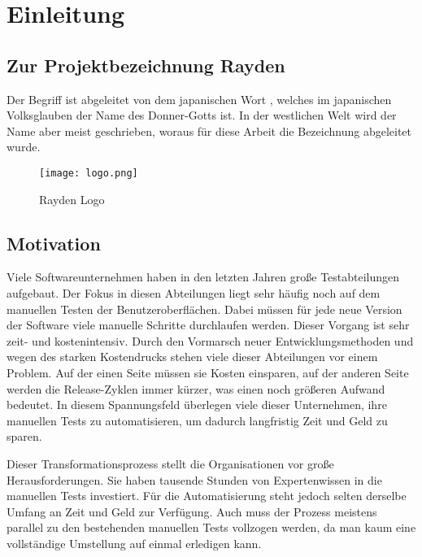 \chapter{Einleitung}
\label{cha:Einleitung}

\section{Zur Projektbezeichnung Rayden}

Der Begriff  ist abgeleitet von dem japanischen Wort , welches im japanischen Volksglauben der Name des Donner-Gotts ist. In der westlichen Welt wird der Name aber meist  geschrieben, woraus für diese Arbeit die Bezeichnung  abgeleitet wurde.

\begin{figure}[h]
\centering
\texttt{[image: logo.png]}
\caption{Rayden Logo}
\end{figure}



\section{Motivation}

Viele Softwareunternehmen haben in den letzten Jahren große Testabteilungen aufgebaut. Der Fokus in diesen Abteilungen liegt sehr häufig noch auf dem manuellen Testen der Benutzeroberflächen. Dabei müssen für jede neue Version der Software viele manuelle Schritte durchlaufen werden. Dieser Vorgang ist sehr zeit- und kostenintensiv. Durch den Vormarsch neuer Entwicklungsmethoden und wegen des starken Kostendrucks stehen viele dieser Abteilungen vor einem Problem. Auf der einen Seite müssen sie Kosten einsparen, auf der anderen Seite werden die Release-Zyklen immer kürzer, was einen noch größeren Aufwand bedeutet. In diesem Spannungsfeld überlegen viele dieser Unternehmen, ihre manuellen Tests zu automatisieren, um dadurch langfristig Zeit und Geld zu sparen. 

\SuperPar
Dieser Transformationsprozess stellt die Organisationen vor große Herausforderungen. Sie haben tausende Stunden von Expertenwissen in die manuellen Tests investiert. Für die Automatisierung steht jedoch selten derselbe Umfang an Zeit und Geld zur Verfügung. Auch muss der Prozess meistens parallel zu den bestehenden manuellen Tests vollzogen werden, da man kaum eine vollständige Umstellung auf einmal erledigen kann.

